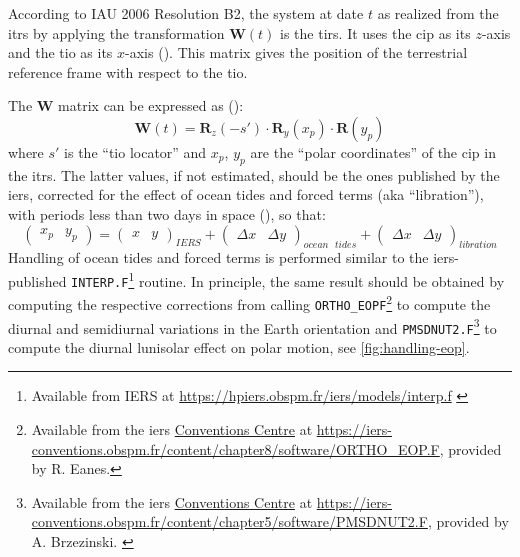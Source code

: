 According to IAU 2006 Resolution B2, the system at date $t$ as realized 
from the \gls{itrs} by applying the transformation $\bm{W}(t)$ is the 
\gls{tirs}. It uses the \gls{cip} as its $z$-axis and the \gls{tio} as 
its $x$-axis (\cite{iers2010}). This matrix gives the position of the 
terrestrial reference frame with respect to the \gls{tio}.

The $\bm{W}$ matrix can be expressed as (\cite{iers2010}):
\begin{equation}
    \bm{W}(t) = \bm{R}_z(-s') \cdot \bm{R}_y(x_p) \cdot \bm{R}(y_p)
    \label{eq:iers1053}
\end{equation}
where $s'$ is the ``\gls{tio} locator'' and $x_p$, $y_p$ are the 
``polar coordinates'' of the \gls{cip} in the \gls{itrs}. The latter values, 
if not estimated, should be the ones published by the \gls{iers}, corrected for 
the effect of ocean tides and forced terms (aka ``libration''), with periods 
less than two days in space (\cite{iers2010}), so that:
\begin{equation}
    \begin{pmatrix} x_p & y_p \end{pmatrix} = 
    \begin{pmatrix} x & y \end{pmatrix}_{IERS} + 
    \begin{pmatrix} \Delta x & \Delta y \end{pmatrix}_{ocean\text{ }tides} + 
    \begin{pmatrix} \Delta x & \Delta y \end{pmatrix}_{libration} 
\end{equation}
Handling of ocean tides and forced terms is performed similar to the \gls{iers}-published 
\texttt{INTERP.F}\footnote{Available from IERS at \url{https://hpiers.obspm.fr/iers/models/interp.f} \label{fn:interp-f}} routine. 
In principle, the same result should be obtained by computing the respective 
corrections from calling \texttt{ORTHO\_EOPF}\footnote{Available from the \gls{iers} \href{https://iers-conventions.obspm.fr/}{Conventions Centre} at \url{https://iers-conventions.obspm.fr/content/chapter8/software/ORTHO_EOP.F}, provided by R. Eanes.\label{fn:ortho-eop-f}} 
to compute the diurnal and semidiurnal variations in the Earth orientation
and \texttt{PMSDNUT2.F}\footnote{Available from the \gls{iers} \href{https://iers-conventions.obspm.fr/}{Conventions Centre} at \url{https://iers-conventions.obspm.fr/content/chapter5/software/PMSDNUT2.F}, provided by A. Brzezinski. \label{fn:pmsdnut2-f}}
to compute the diurnal lunisolar effect on polar motion, see \ref{fig:handling-eop}.

